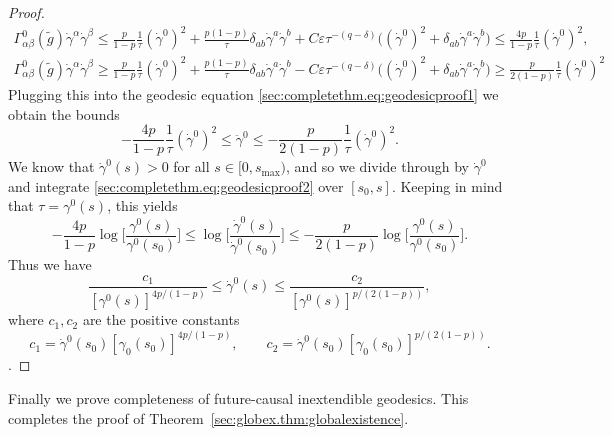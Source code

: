 \documentclass{article}
\newcommand{\wt}{\widetilde}
\newcommand{\ve}{\varepsilon}
\begin{document}
\begin{proof}
    \begin{subequations}
        \begin{gather}
            \Gamma_{\alpha\beta}^0(\wt{g})\dot{\gamma}^\alpha\dot{\gamma}^\beta \leq \frac{p}{1-p}\frac{1}{\tau}(\dot{\gamma}^0)^2 + \frac{p(1-p)}{\tau}\delta_{ab}\dot{\gamma}^a\dot{\gamma}^b  + C\ve\tau^{-(q-\delta)}\big((\dot{\gamma}^0)^2+\delta_{ab}\dot{\gamma}^a\dot{\gamma}^b\big)\leq \frac{4p}{1-p}\frac{1}{\tau}(\dot{\gamma}^0)^2,\\
            \Gamma_{\alpha\beta}^0(\wt{g})\dot{\gamma}^\alpha\dot{\gamma}^\beta \geq \frac{p}{1-p}\frac{1}{\tau}(\dot{\gamma}^0)^2 + \frac{p(1-p)}{\tau}\delta_{ab}\dot{\gamma}^a\dot{\gamma}^b  - C\ve\tau^{-(q-\delta)}\big((\dot{\gamma}^0)^2+\delta_{ab}\dot{\gamma}^a\dot{\gamma}^b\big)\geq \frac{p}{2(1-p)}\frac{1}{\tau}(\dot{\gamma}^0)^2
        \end{gather}
    \end{subequations}
    Plugging this into the geodesic equation \eqref{sec:completethm.eq:geodesicproof1} we obtain the bounds
    \begin{equation}\label{sec:completethm.eq:geodesicproof2}
        -\frac{4p}{1-p}\frac{1}{\tau}(\dot{\gamma}^0)^2\leq \ddot{\gamma}^0 \leq  - \frac{p}{2(1-p)}\frac{1}{\tau}(\dot{\gamma}^0)^2.
    \end{equation}
    We know that $\dot{\gamma}^0(s) > 0$ for all $s \in [0,s_{\max})$, and so we divide through by $\dot{\gamma}^0$ and integrate \eqref{sec:completethm.eq:geodesicproof2} over $[s_0,s]$. Keeping in mind that $\tau = \gamma^0(s)$, this yields
    \begin{equation}
        -\frac{4p}{1-p}\log\Big[\frac{\gamma^0(s)}{\gamma^0(s_0)}\Big] \leq \log \Big[\frac{\dot{\gamma}^0(s)}{\dot{\gamma}^0(s_0)}\Big] \leq -\frac{p}{2(1-p)}\log \Big[\frac{\gamma^0(s)}{\gamma^0(s_0)}\Big].
    \end{equation}
    Thus we have
    \begin{equation}
        \frac{c_1}{[\gamma^0(s)]^{4p/(1-p)}} \leq \dot{\gamma}^0(s) \leq \frac{c_2}{[\gamma^0(s)]^{p/(2(1-p))}},
    \end{equation}
    where $c_1,c_2$ are the positive constants 
    \begin{equation}
        c_1 = \dot{\gamma}^0(s_0)[\gamma_0(s_0)]^{4p/(1-p)},\qquad c_2 = \dot{\gamma}^0(s_0)[\gamma_0(s_0)]^{p/(2(1-p))}.
    \end{equation}.
\end{proof}
Finally we prove completeness of future-causal inextendible geodesics. This completes the proof of Theorem~\ref{sec:globex.thm:globalexistence}.
\end{document}
